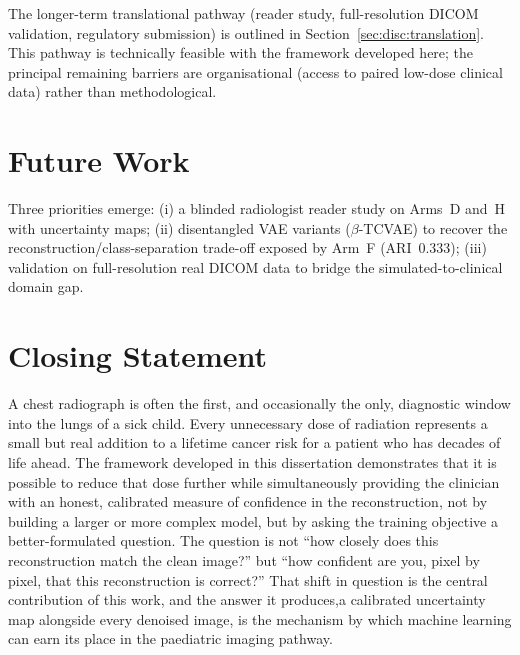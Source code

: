 \documentclass[12pt, a4paper, twoside, openright]{book}
\begin{document}
The longer-term translational pathway (reader study, full-resolution DICOM validation, regulatory submission) is outlined in Section~\ref{sec:disc:translation}. This pathway is technically feasible with the framework developed here; the principal remaining barriers are organisational (access to paired low-dose clinical data) rather than methodological.

\section{Future Work}
\label{sec:conc:future}

Three priorities emerge: (i) a blinded radiologist reader study on Arms~D and~H with uncertainty maps; (ii) disentangled VAE variants ($\beta$-TCVAE) to recover the reconstruction/class-separation trade-off exposed by Arm~F (ARI~$0.333$); (iii) validation on full-resolution real DICOM data to bridge the simulated-to-clinical domain gap.

\section{Closing Statement}
\label{sec:conc:closing}

A chest radiograph is often the first, and occasionally the only, diagnostic window into the lungs of a sick child. Every unnecessary dose of radiation represents a small but real addition to a lifetime cancer risk for a patient who has decades of life ahead. The framework developed in this dissertation demonstrates that it is possible to reduce that dose further while simultaneously providing the clinician with an honest, calibrated measure of confidence in the reconstruction, not by building a larger or more complex model, but by asking the training objective a better-formulated question. The question is not ``how closely does this reconstruction match the clean image?'' but ``how confident are you, pixel by pixel, that this reconstruction is correct?'' That shift in question is the central contribution of this work, and the answer it produces,a calibrated uncertainty map alongside every denoised image, is the mechanism by which machine learning can earn its place in the paediatric imaging pathway.

  
\end{document}
